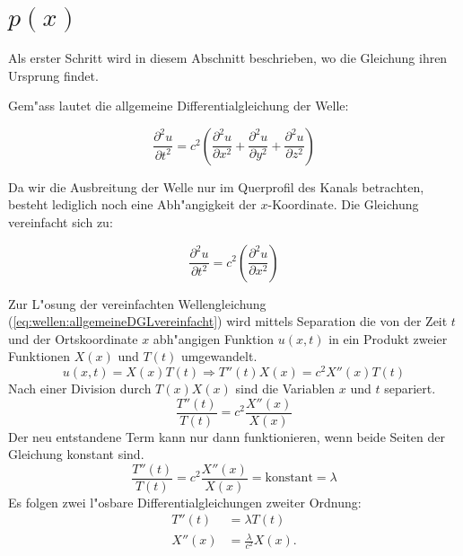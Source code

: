 \section{\texorpdfstring{$p(x)$}{p(x)}}
Als erster Schritt wird in diesem Abschnitt beschrieben, wo die Gleichung ihren 
Ursprung findet.

Gem"ass \cite{wellen:smirnow2} lautet die allgemeine Differentialgleichung der 
Welle:

\begin{equation*}
	\frac{\partial^2 u}{\partial t^2}
	=
	c^2
	\left(
		\frac{\partial^2 u}{\partial x^2} 
		+ \frac{\partial^2 u}{\partial y^2} 
		+ \frac{\partial^2 u}{\partial z^2}
	\right)
	\label{eq:wellen:allgemeineDGL}
\end{equation*}

Da wir die Ausbreitung der Welle nur im Querprofil des Kanals betrachten, 
besteht lediglich noch eine Abh"angigkeit der $x$-Koordinate. Die Gleichung 
vereinfacht sich zu:

\begin{equation}
	\frac{\partial^2 u}{\partial t^2}
	=
	c^2
	\left(
		\frac{\partial^2 u}{\partial x^2} 
	\right)
	\label{eq:wellen:allgemeineDGLvereinfacht}
\end{equation}

Zur L"osung der vereinfachten Wellengleichung 
(\ref{eq:wellen:allgemeineDGLvereinfacht}) wird mittels Separation die von der 
Zeit $t$ und der Ortskoordinate $x$ abh"angigen Funktion $u(x,t)$ in ein 
Produkt zweier Funktionen $X(x)$ und $T(t)$ umgewandelt.
\begin{equation*}
	u (x,t) = X(x) T(t)
	\Rightarrow T''(t) X(x) = c^2 X''(x)T(t)
\end{equation*}
Nach einer Division durch $T(x)X(x)$ sind die Variablen $x$ und $t$ separiert.
\begin{equation*}
	\frac{T''(t)}{T(t)}
	=
	c^2 \frac{X''(x)}{X(x)}
\end{equation*}
Der neu entstandene Term kann nur dann funktionieren, wenn beide Seiten der 
Gleichung konstant sind.
\begin{equation*}
	\frac{T''(t)}{T(t)}
	=
	c^2 \frac{X''(x)}{X(x)} = \text{konstant} = \lambda
\end{equation*}
Es folgen zwei l"osbare Differentialgleichungen zweiter Ordnung:
\begin{align*}
	T''(t) &= \lambda T(t) \\
	X''(x) &= \frac{\lambda}{c^2}X(x).
\end{align*}

